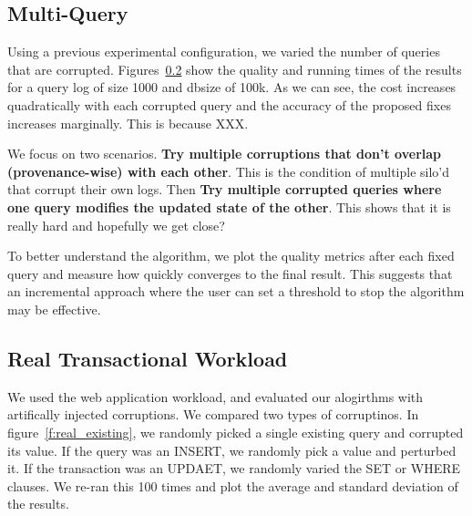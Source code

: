 {  \subsection{Multi-Query}

  Using a previous experimental configuration, we varied the number of queries that are corrupted.  Figures~\ref{}
  show the quality and running times of the results for a query log of size 1000 and dbsize of 100k.  
  As we can see, the cost increases quadratically with each corrupted query and the accuracy of the proposed fixes increases marginally.  
  This is because XXX.

  We focus on two scenarios.  {\bf Try multiple corruptions that don't overlap (provenance-wise) with each other}.  This is the condition of multiple silo'd that
  corrupt their own logs.  Then {\bf Try multiple corrupted queries where one query modifies the updated state of the other}.  This shows that
  it is really hard and hopefully we get close?



  To better understand the algorithm, we plot the quality metrics after each fixed query and measure how quickly \sys converges to the final result. 
  This suggests that an incremental approach where the user can set a threshold to stop the algorithm may be effective.



  \subsection{Real Transactional Workload}

  We used the web application workload, and evaluated our alogirthms with artifically injected corruptions.
  We compared two types of corruptinos.  In figure~\ref{f:real_existing}, we randomly picked a single existing 
  query and corrupted its value.  If the query was an INSERT, we randomly pick a value and perturbed it.
  If the transaction was an UPDAET, we randomly varied the SET or WHERE clauses.   We re-ran this
  100 times and plot the average and standard deviation of the results.

}
\fi
